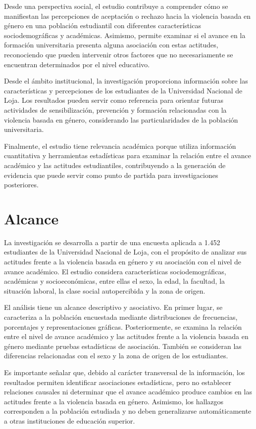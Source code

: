 \documentclass[
  spanish,
  11pt,
  letterpaper,
  DIV=11,
  numbers=noendperiod]{scrreprt}
\begin{document}
Desde una perspectiva social, el estudio contribuye a comprender cómo se
manifiestan las percepciones de aceptación o rechazo hacia la violencia
basada en género en una población estudiantil con diferentes
características sociodemográficas y académicas. Asimismo, permite
examinar si el avance en la formación universitaria presenta alguna
asociación con estas actitudes, reconociendo que pueden intervenir otros
factores que no necesariamente se encuentran determinados por el nivel
educativo.

Desde el ámbito institucional, la investigación proporciona información
sobre las características y percepciones de los estudiantes de la
Universidad Nacional de Loja. Los resultados pueden servir como
referencia para orientar futuras actividades de sensibilización,
prevención y formación relacionadas con la violencia basada en género,
considerando las particularidades de la población universitaria.

Finalmente, el estudio tiene relevancia académica porque utiliza
información cuantitativa y herramientas estadísticas para examinar la
relación entre el avance académico y las actitudes estudiantiles,
contribuyendo a la generación de evidencia que puede servir como punto
de partida para investigaciones posteriores.

\section{Alcance}\label{alcance}

La investigación se desarrolla a partir de una encuesta aplicada a 1.452
estudiantes de la Universidad Nacional de Loja, con el propósito de
analizar sus actitudes frente a la violencia basada en género y su
asociación con el nivel de avance académico. El estudio considera
características sociodemográficas, académicas y socioeconómicas, entre
ellas el sexo, la edad, la facultad, la situación laboral, la clase
social autopercibida y la zona de origen.

El análisis tiene un alcance descriptivo y asociativo. En primer lugar,
se caracteriza a la población encuestada mediante distribuciones de
frecuencias, porcentajes y representaciones gráficas. Posteriormente, se
examina la relación entre el nivel de avance académico y las actitudes
frente a la violencia basada en género mediante pruebas estadísticas de
asociación. También se consideran las diferencias relacionadas con el
sexo y la zona de origen de los estudiantes.

Es importante señalar que, debido al carácter transversal de la
información, los resultados permiten identificar asociaciones
estadísticas, pero no establecer relaciones causales ni determinar que
el avance académico produce cambios en las actitudes frente a la
violencia basada en género. Asimismo, los hallazgos corresponden a la
población estudiada y no deben generalizarse automáticamente a otras
instituciones de educación superior.
\end{document}
